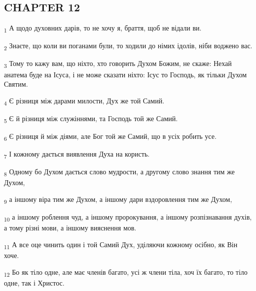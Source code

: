 \subsection{CHAPTER 12}
\begin{tcolorbox}
\textsubscript{1} А щодо духовних дарів, то не хочу я, браття, щоб не відали ви.
\end{tcolorbox}
\begin{tcolorbox}
\textsubscript{2} Знаєте, що коли ви поганами були, то ходили до німих ідолів, ніби воджено вас.
\end{tcolorbox}
\begin{tcolorbox}
\textsubscript{3} Тому то кажу вам, що ніхто, хто говорить Духом Божим, не скаже: Нехай анатема буде на Ісуса, і не може сказати ніхто: Ісус то Господь, як тільки Духом Святим.
\end{tcolorbox}
\begin{tcolorbox}
\textsubscript{4} Є різниця між дарами милости, Дух же той Самий.
\end{tcolorbox}
\begin{tcolorbox}
\textsubscript{5} Є й різниця між служіннями, та Господь той же Самий.
\end{tcolorbox}
\begin{tcolorbox}
\textsubscript{6} Є різниця й між діями, але Бог той же Самий, що в усіх робить усе.
\end{tcolorbox}
\begin{tcolorbox}
\textsubscript{7} І кожному дається виявлення Духа на користь.
\end{tcolorbox}
\begin{tcolorbox}
\textsubscript{8} Одному бо Духом дається слово мудрости, а другому слово знання тим же Духом,
\end{tcolorbox}
\begin{tcolorbox}
\textsubscript{9} а іншому віра тим же Духом, а іншому дари вздоровлення тим же Духом,
\end{tcolorbox}
\begin{tcolorbox}
\textsubscript{10} а іншому роблення чуд, а іншому пророкування, а іншому розпізнавання духів, а тому різні мови, а іншому вияснення мов.
\end{tcolorbox}
\begin{tcolorbox}
\textsubscript{11} А все оце чинить один і той Самий Дух, уділяючи кожному осібно, як Він хоче.
\end{tcolorbox}
\begin{tcolorbox}
\textsubscript{12} Бо як тіло одне, але має членів багато, усі ж члени тіла, хоч їх багато, то тіло одне, так і Христос.
\end{tcolorbox}
